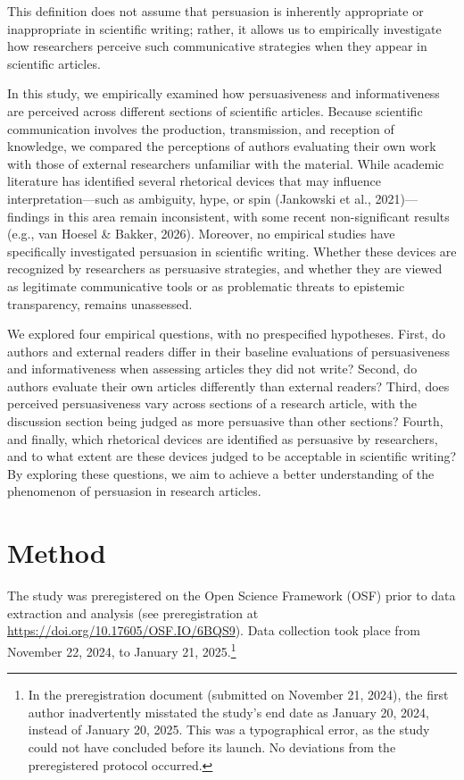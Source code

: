 \documentclass[authordate, meta]{jote-new-article}
\begin{document}
	This definition does not assume that persuasion is inherently appropriate or inappropriate in scientific writing; rather, it allows us to empirically investigate how researchers perceive such communicative strategies when they appear in scientific articles.



	In this study, we empirically examined how persuasiveness and informativeness are perceived across different sections of scientific articles. Because scientific communication involves the production, transmission, and reception of knowledge, we compared the perceptions of authors evaluating their own work with those of external researchers unfamiliar with the material. While academic literature has identified several rhetorical devices that may influence interpretation—such as ambiguity, hype, or spin (Jankowski et al., 2021)—findings in this area remain inconsistent, with some recent non-significant results (e.g., van Hoesel \& Bakker, 2026). Moreover, no empirical studies have specifically investigated persuasion in scientific writing. Whether these devices are recognized by researchers as persuasive strategies, and whether they are viewed as legitimate communicative tools or as problematic threats to epistemic transparency, remains unassessed.



	We explored four empirical questions, with no prespecified hypotheses. First, do authors and external readers differ in their baseline evaluations of persuasiveness and informativeness when assessing articles they did not write? Second, do authors evaluate their own articles differently than external readers? Third, does perceived persuasiveness vary across sections of a research article, with the discussion section being judged as more persuasive than other sections? Fourth, and finally, which rhetorical devices are identified as persuasive by researchers, and to what extent are these devices judged to be acceptable in scientific writing? By exploring these questions, we aim to achieve a better understanding of the phenomenon of persuasion in research articles.



	\section{Method}



	The study was preregistered on the Open Science Framework (OSF) prior to data extraction and analysis (see preregistration at \url{https://doi.org/10.17605/OSF.IO/6BQS9}). Data collection took place from November 22, 2024, to January 21, 2025.\footnote{ In the preregistration document (submitted on November 21, 2024), the first author inadvertently misstated the study's end date as January 20, 2024, instead of January 20, 2025. This was a typographical error, as the study could not have concluded before its launch. No deviations from the preregistered protocol occurred.}
\end{document}
